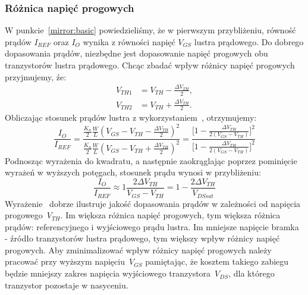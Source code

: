 \documentclass[twoside,pl,final]{labman}
\begin{document}
\subsubsection{Różnica napięć progowych}
\label{mirror:matching:vth}
W punkcie~\ref{mirror:basic} powiedzieliśmy,
że w pierwszym przybliżeniu, równość prądów $I_{REF}$ oraz $I_O$
wynika z równości napięć $V_{GS}$ lustra prądowego.
Do dobrego dopasowania prądów, niezbędne jest dopasowanie
napięć progowych obu tranzystorów lustra prądowego.
Chcąc zbadać wpływ różnicy napięć progowych przyjmujemy, źe:
\begin{eqnarray}
  V_{TH1} &= V_{TH} - \frac{\Delta V_{TH}}{2}, \nonumber \\
  V_{TH2} &= V_{TH} + \frac{\Delta V_{TH}}{2}.
  \label{eqn:matching:vth}
\end{eqnarray}
Obliczając stosunek prądów lustra z
wykorzystaniem~, otrzymujemy:
\begin{equation}
  \frac{I_O}{I_{REF}} = \frac{\frac{K_n}{2} \frac{W}{L} (V_{GS} - V_{TH} - \frac{\Delta V_{TH}}{2})^2}
    {\frac{K_n}{2} \frac{W}{L} (V_{GS} - V_{TH} + \frac{\Delta V_{TH}}{2})^2} =
    \frac{\big[1 - \frac{\Delta V_{TH}}{2 (V_{GS} - V_{TH})}\big]^2}
    {\big[1 - \frac{\Delta V_{TH}}{2 (V_{GS} - V_{TH})}\big]^2}
  \label{eqn:matching:vth:ratio}
\end{equation}
Podnosząc wyrażenia do kwadratu, a następnie zaokrąglając poprzez pominięcie
wyrażeń w wyższych potęgach, stosunek prądu wynosi w przybliżeniu:
\begin{equation}
  \frac{I_O}{I_{REF}} \approx 1 \frac{2 \Delta V_{TH}}{V_{GS} - V_{TH}} =
    1 - \frac{2 \Delta V_{TH}}{V_{DSsat}}
  \label{eqn:matching:vth:approx}
\end{equation}
Wyrażenie~ dobrze ilustruje jakość
dopasowania prądów w zależności od napięcia progowego~$V_{TH}$.
Im większa różnica napięć progowych, tym większa różnica prądów:
referencyjnego i wyjściowego prądu lustra.
Im mniejsze napięcie bramka - źródło tranzystorów lustra prądowego,
tym większy wpływ różnicy napięć progowych.
Aby zminimalizować wpływ różnicy napięć progowych należy pracować przy
wyższym napięciu~$V_{GS}$ pamiętając, że kosztem takiego zabiegu będzie
mniejszy zakres napięcia wyjściowego tranzystora~$V_{DS}$,
dla którego tranzystor pozostaje w nasyceniu.
\end{document}
